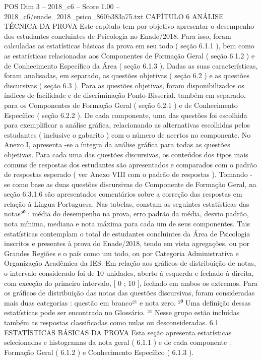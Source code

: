\begin{textsample}{POS Dim 3 – 2018\_c6 – Score 1.00 – 2018\_c6/enade\_2018\_psico\_860b383a75.txt}  \label{ex:f3_pos_115}
CAPÍTULO 6 ANÁLISE TÉCNICA DA PROVA Este capítulo tem por objetivo apresentar o desempenho dos estudantes concluintes de Psicologia no Enade/2018.
Para isso, foram calculadas as estatísticas básicas da prova em seu todo ( seção 6.1.1 ), bem como as estatísticas relacionadas aos Componentes de Formação Geral ( seção 6.1.2 ) e de Conhecimento Específico da Área ( seção 6.1.3 ).
Dadas as suas características, foram analisadas, em separado, as questões objetivas ( seção 6.2 ) e as questões discursivas ( seção 6.3 ).
Para as questões objetivas, foram disponibilizados os índices de facilidade e de discriminação Ponto-Bisserial, também em separado, para os Componentes de Formação Geral ( seção 6.2.1 ) e de Conhecimento Específico ( seção 6.2.2 ).
De cada componente, uma das questões foi escolhida para exemplificar a análise gráfica, relacionando as alternativas escolhidas pelos estudantes ( inclusive o gabarito ) com o número de acertos no componente.
No Anexo I, apresenta -se a íntegra da análise gráfica para todas as questões objetivas.
Para cada uma das questões discursivas, os conteúdos dos tipos mais comuns de respostas dos estudantes são apresentados e comparados com o padrão de respostas esperado ( ver Anexo VIII com o padrão de respostas ).
Tomando -se como base as duas questões discursivas do Componente de Formação Geral, na seção 6.3.1.6 são apresentados comentários sobre a correção das respostas em relação à Língua Portuguesa.
Nas tabelas, constam as seguintes estatísticas das notas²⁰ : média do desempenho na prova, erro padrão da média, desvio padrão, nota mínima, mediana e nota máxima para cada um de seus componentes.
Tais estatísticas contemplam o total de estudantes concluintes da Área de Psicologia inscritos e presentes à prova do Enade/2018, tendo em vista agregações, ou por Grandes Regiões e o país como um todo, ou por Categoria Administrativa e Organização Acadêmica da IES.
Em relação aos gráficos de distribuição de notas, o intervalo considerado foi de 10 unidades, aberto à esquerda e fechado à direita, com exceção do primeiro intervalo, [ 0 ; 10 ], fechado em ambos os extremos.
Para os gráficos de distribuição das notas das questões discursivas, foram consideradas mais duas categorias : questão em branco²¹ e nota zero. ²⁰ Uma definição dessas estatísticas pode ser encontrada no Glossário. ²¹ Nesse grupo estão incluídas também as respostas classificadas como nulas ou desconsideradas. 6.1 ESTATÍSTICAS BÁSICAS DA PROVA Esta seção apresenta estatísticas selecionadas e histogramas da nota geral ( 6.1.1 ) e de cada componente : Formação Geral ( 6.1.2 ) e Conhecimento Específico ( 6.1.3 ).

\end{textsample}
